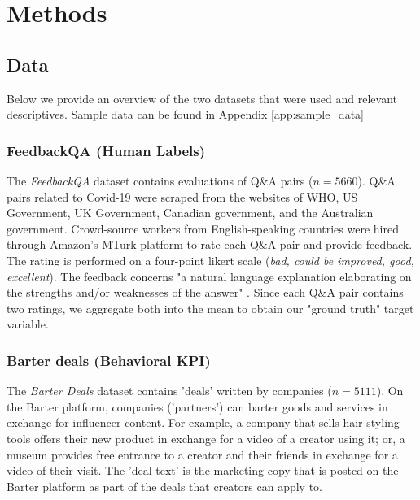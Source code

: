 
\section{Methods}

\subsection{Data}

Below we provide an overview of the two datasets that were used and relevant descriptives. Sample data can be found in Appendix \ref{app:sample_data}

\subsubsection{FeedbackQA (Human Labels)} 

The \textit{FeedbackQA} dataset \citet{li_using_2022} contains evaluations of Q\&A pairs ($n=5660$). Q\&A pairs related to Covid-19 were scraped from the websites of WHO, US Government, UK Government, Canadian government, and the Australian government. Crowd-source workers from English-speaking countries were hired through Amazon's MTurk platform to rate each Q\&A pair and provide feedback. The rating is performed on a four-point likert scale (\textit{bad, could be improved, good, excellent}). The feedback concerns "a natural language explanation elaborating on the strengths and/or weaknesses of the answer" \citep{li_using_2022}. Since each Q\&A pair contains two ratings, we aggregate both into the mean to obtain our "ground truth" target variable. 





\subsubsection{Barter deals (Behavioral KPI)}

The \textit{Barter Deals} dataset contains 'deals' written by companies ($n=5111$). On the Barter platform, companies ('partners') can barter goods and services in exchange for influencer content. For example, a company that sells hair styling tools offers their new product in exchange for a video of a creator using it; or, a museum provides free entrance to a creator and their friends in exchange for a video of their visit. The 'deal text' is the marketing copy that is posted on the Barter platform as part of the deals that creators can apply to. 

